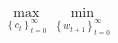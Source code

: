 \documentclass[preview]{standalone}
\begin{document}
\begin{align*}
\max_{\left\{c_t\right\}_{t=0}^{\infty}} \min_{\left\{w_{t+1}\right\}_{t=0}^{\infty}}
\end{align*}
\end{document}

